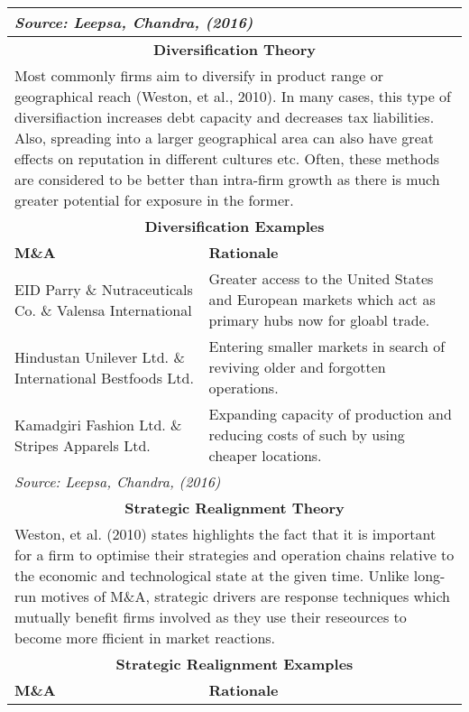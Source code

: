 \documentclass[11pt, english]{article}
\begin{document}
\begin{center}
\begin{longtable}{p{5cm}p{7.5cm}}
	\hline
        \multicolumn{2}{p{13cm}}{\textit{Source: Leepsa, Chandra, (2016)}}\\
        \hline
        \hline
        \multicolumn{2}{c}{\textbf{Diversification Theory}}\\
        \hline
        \hline
        \multicolumn{2}{p{13cm}}{Most commonly firms aim to diversify in product range or geographical reach (Weston, et al., 2010). In many cases, this type of diversifiaction increases debt capacity and decreases tax liabilities. Also, spreading into a larger geographical area can also have great effects on reputation in different cultures etc. Often, these methods are considered to be better than intra-firm growth as there is much greater potential for exposure in the former.}\\
        \hline
        \multicolumn{2}{c}{\textbf{Diversification Examples}}\\
        \hline
        \textbf{M\&A} & \textbf{Rationale}\\ 
        \hline
        EID Parry \& Nutraceuticals Co. \& Valensa International & Greater access to the United States and European markets which act as primary hubs now for gloabl trade.\\
        Hindustan Unilever Ltd. \& International Bestfoods Ltd. & Entering smaller markets in search of reviving older and forgotten operations.\\
        Kamadgiri Fashion Ltd. \& Stripes Apparels Ltd. & Expanding capacity of production and reducing costs of such by using cheaper locations.\\
        \hline
        \multicolumn{2}{p{13cm}}{\textit{Source: Leepsa, Chandra, (2016)}}\\
        \hline
        \hline
        \multicolumn{2}{c}{\textbf{Strategic Realignment Theory}}\\
        \hline
        \hline
        \multicolumn{2}{p{13cm}}{Weston, et al. (2010) states highlights the fact that it is important for a firm to optimise their strategies and operation chains relative to the economic and technological state at the given time. Unlike long-run motives of M\&A, strategic drivers are response techniques which mutually benefit firms involved as they use their reseources to become more fficient in market reactions.}\\
	\hline
        \multicolumn{2}{c}{\textbf{Strategic Realignment Examples}}\\
        \hline
        \textbf{M\&A} & \textbf{Rationale}\\ 

\end{longtable}
\end{center}
\end{document}
